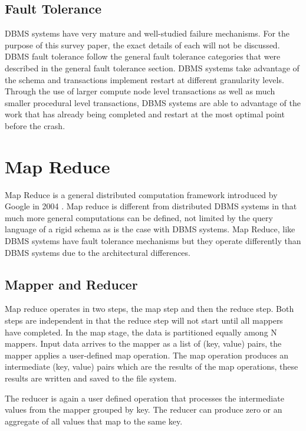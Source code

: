 \documentclass[10pt,twocolumn]{IEEEtran11}
\begin{document}
\subsection{Fault Tolerance}
DBMS systems have very mature and well-studied failure mechanisms.  For the purpose of this survey paper, the exact details of each will not be discussed.  DBMS fault tolerance follow the general fault tolerance categories that were described in the general fault tolerance section.  DBMS systems take advantage of the schema and transactions implement restart at different granularity levels.  Through the use of larger compute node level transactions as well as much smaller procedural level transactions, DBMS systems are able to advantage of the work that has already being completed and restart at the most optimal point before the crash.



\section {Map Reduce}

Map Reduce is a general distributed computation framework introduced by Google in 2004 \cite{dean2001mapreduce}.  Map reduce is different from distributed DBMS systems in that much more general computations can be defined, not limited by the query language of a rigid schema as is the case with DBMS systems.  Map Reduce, like DBMS systems have fault tolerance mechanisms but they operate differently than DBMS systems due to the architectural differences. 

\subsection{Mapper and Reducer}
Map reduce operates in two steps, the map step and then the reduce step.  Both steps are independent in that the reduce step will not start until all mappers have completed.
In the map stage, the data is partitioned equally among N mappers.  Input data arrives to the mapper as a list of (key, value) pairs, the mapper applies a user-defined map operation.
The map operation produces an intermediate (key, value) pairs which are the results of the map operations, these results are written and saved to the file system.  
\par
The reducer is again a user defined operation that processes the intermediate values from the mapper grouped by key.  The reducer can produce zero or an aggregate of all values
that map to the same key.
\end{document}
